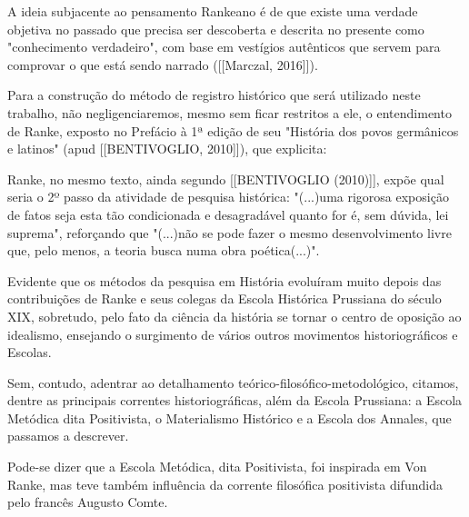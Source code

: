 A ideia subjacente ao pensamento Rankeano é de que existe uma verdade objetiva no passado que precisa ser descoberta e descrita no presente como "conhecimento verdadeiro", com base em vestígios autênticos que servem para comprovar o que está sendo narrado ([[Marczal, 2016]]).

Para a construção do método de registro histórico que será utilizado neste trabalho, não negligenciaremos, mesmo sem ficar restritos a ele, o entendimento de Ranke, exposto no Prefácio à 1ª edição de seu "História dos povos germânicos e latinos"  (apud [[BENTIVOGLIO, 2010]]), que explicita:


\noindent\begin{center}\mbox{\centering{}}\end{center}


Ranke, no mesmo texto, ainda segundo  [[BENTIVOGLIO (2010)]], expõe qual seria o 2º passo da atividade de pesquisa histórica: "(...)uma rigorosa exposição de fatos seja esta tão condicionada e desagradável quanto for é, sem dúvida, lei suprema", reforçando que "(...)não se pode fazer o mesmo desenvolvimento livre que, pelo menos, a teoria busca numa obra poética(...)".

Evidente que os métodos da pesquisa em História evoluíram muito depois das contribuições de Ranke e seus colegas da Escola Histórica Prussiana do século XIX, sobretudo, pelo fato da ciência  da história se tornar o centro de oposição ao idealismo, ensejando o surgimento de vários outros movimentos historiográficos e Escolas.

Sem, contudo, adentrar ao detalhamento teórico-filosófico-metodológico, citamos, dentre as principais correntes historiográficas, além da Escola Prussiana: a Escola Metódica dita Positivista, o Materialismo Histórico e a Escola dos Annales, que passamos a descrever.

Pode-se dizer que a Escola Metódica, dita Positivista, foi inspirada em Von Ranke, mas teve também influência da corrente filosófica positivista difundida pelo francês Augusto Comte.

